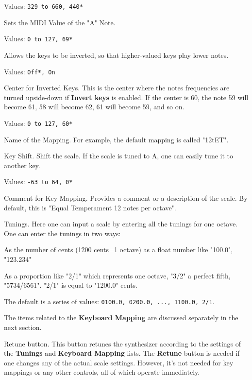    Values: \texttt{329 to 660, 440*}

   Sets the MIDI Value of the "A" Note.

   Values: \texttt{0 to 127, 69*}

   Allows the keys to be inverted, so that higher-valued keys play lower
   notes.

   Values: \texttt{Off*, On}

   Center for Inverted Keys.
   This is the center where the notes frequencies are turned upside-down if
   \textbf{Invert keys} is enabled.
   If the center is 60, the note 59 will become 61, 58 will become 62, 61
   will become 59, and so on.

   Values: \texttt{0 to 127, 60*}

   Name of the Mapping.
   For example, the default mapping is called "12tET".

   Key Shift.
   Shift the scale. If the scale is tuned to A, one can easily tune it to
   another key.

   Values: \texttt{-63 to 64, 0*}

   Comment for Key Mapping.
   Provides a comment or a description of the scale.
   By default, this is "Equal Temperament 12 notes per octave".

   Tunings.
   Here one can input a scale by entering all the tunings for one octave.
One can enter the tunings in two ways:

   \begin{enumber}
      \item As the number of cents (1200 cents=1 octave) as a float number
         like "100.0", "123.234"
      \item As a proportion like "2/1" which represents one octave, "3/2" a
         perfect fifth, "5734/6561".  "2/1" is equal to "1200.0" cents.
   \end{enumber}

   The default is a series of values:
   \texttt{0100.0, 0200.0, ..., 1100.0, 2/1}.

   The items related to the \textbf{Keyboard Mapping} are discussed
   separately in the next section.

   Retune button.
   This button retunes the synthesizer according to the settings of
   the \textbf{Tunings} and \textbf{Keyboard Mapping} lists.
   The \textbf{Retune} button is needed if one
   changes any of the actual scale settings. However, it's not needed for key
   mappings or any other controls, all of which operate immediately.

